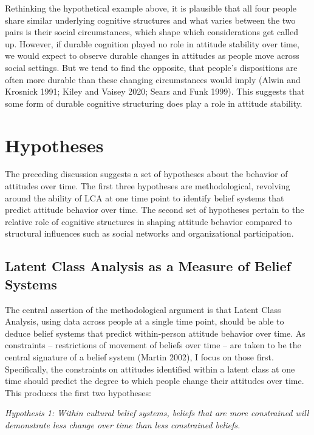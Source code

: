 \documentclass[12pt,]{article}
\begin{document}
Rethinking the hypothetical example above, it is plausible that all four people share similar underlying cognitive structures and what varies between the two pairs is their social circumstances, which shape which considerations get called up. However, if durable cognition played no role in attitude stability over time, we would expect to observe durable changes in attitudes as people move across social settings. But we tend to find the opposite, that people's dispositions are often more durable than these changing circumstances would imply (Alwin and Krosnick 1991; Kiley and Vaisey 2020; Sears and Funk 1999). This suggests that some form of durable cognitive structuring does play a role in attitude stability.

\hypertarget{hypotheses}{%
\section{Hypotheses}\label{hypotheses}}

The preceding discussion suggests a set of hypotheses about the behavior of attitudes over time. The first three hypotheses are methodological, revolving around the ability of LCA at one time point to identify belief systems that predict attitude behavior over time. The second set of hypotheses pertain to the relative role of cognitive structures in shaping attitude behavior compared to structural influences such as social networks and organizational participation.

\hypertarget{latent-class-analysis-as-a-measure-of-belief-systems}{%
\subsection{Latent Class Analysis as a Measure of Belief Systems}\label{latent-class-analysis-as-a-measure-of-belief-systems}}

The central assertion of the methodological argument is that Latent Class Analysis, using data across people at a single time point, should be able to deduce belief systems that predict within-person attitude behavior over time. As constraints -- restrictions of movement of beliefs over time -- are taken to be the central signature of a belief system (Martin 2002), I focus on those first. Specifically, the constraints on attitudes identified within a latent class at one time should predict the degree to which people change their attitudes over time. This produces the first two hypotheses:

\emph{Hypothesis 1: Within cultural belief systems, beliefs that are more constrained will demonstrate less change over time than less constrained beliefs.}
\end{document}
